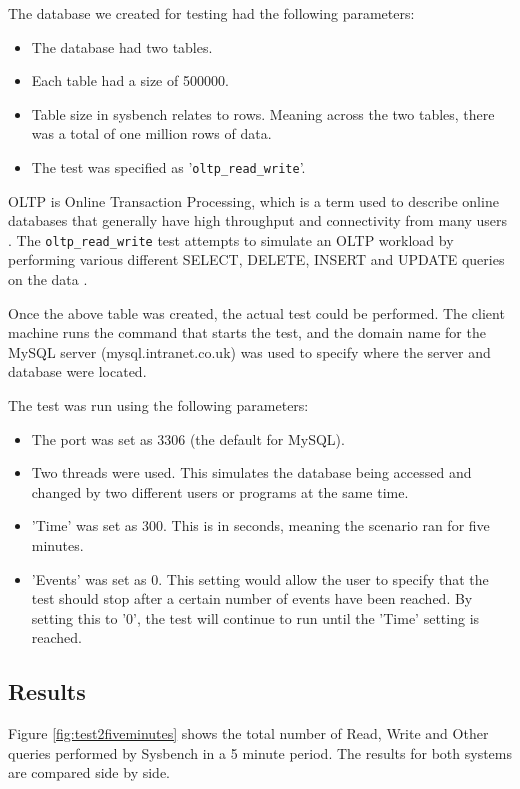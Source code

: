 The database we created for testing had the following parameters:
\begin{itemize}
  \item The database had two tables.
  \item Each table had a size of 500000.
  \item Table size in sysbench relates to rows. Meaning across the two tables, there was a total of one million rows of data.
  \item The test was specified as '\texttt{oltp\_read\_write}'.
\end{itemize}

OLTP is Online Transaction Processing\citep{oltpbenchmarking}, which is a term used to describe online databases that generally have high throughput and connectivity from many users \citep{oracleoltp}. The \texttt{oltp\_read\_write} test attempts to simulate an OLTP workload by performing various different SELECT, DELETE, INSERT and UPDATE queries on the data \citep{sysbenchmarking}.

Once the above table was created, the actual test could be performed. The client machine runs the command that starts the test, and the domain name for the MySQL server (mysql.intranet.co.uk) was used to specify where the server and database were located.

The test was run using the following parameters:
\begin{itemize}
  \item The port was set as 3306 (the default for MySQL).
  \item Two threads were used. This simulates the database being accessed and changed by two different users or programs at the same time.
  \item 'Time' was set as 300. This is in seconds, meaning the scenario ran for five minutes.
  \item 'Events' was set as 0. This setting would allow the user to specify that the test should stop after a certain number of events have been reached. By setting this to '0', the test will continue to run until the 'Time' setting is reached.
\end{itemize}
\subsection{Results}
\label{test2results}

Figure \ref{fig:test2fiveminutes} shows the total number of Read, Write and Other queries performed by Sysbench in a 5 minute period. The results for both systems are compared side by side.

